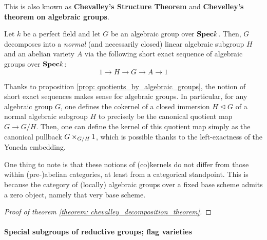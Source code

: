                     \begin{theorem} \label{theorem: chevalley_decomposition_theorem}
                        This is also known as \textbf{Chevalley's Structure Theorem} and \textbf{Chevelley's theorem on algebraic groups}.
                    
                        Let $k$ be a perfect field and let $G$ be an algebraic group over $\mathbf{Spec} k$. Then, $G$ decomposes into a \textit{normal} (and necessarily closed) linear algebraic subgroup $H$ and an abelian variety $A$ via the following short exact sequence of algebraic groups over $\mathbf{Spec} k$:
                            $$1 \to H \to G \to A \to 1$$
                    \end{theorem}
                    \begin{remark} \label{remark: short_exact_sequences_algebraic_groups}
                        Thanks to proposition \ref{prop: quotients_by_algebraic_groups}, the notion of short exact sequences makes sense for algebraic groups. In particular, for any algebraic group $G$, one defines the cokernel of a closed immersion $H \trianglelefteq G$ of a normal algebraic subgroup $H$ to precisely be the canonical quotient map $G \to G/H$. Then, one can define the kernel of this quotient map simply as the canonical pullback $G \x_{G/H} 1$, which is possible thanks to the left-exactness of the Yoneda embedding. 
                        
                        One thing to note is that these notions of (co)kernels do not differ from those within (pre-)abelian categories, at least from a categorical standpoint. This is because the category of (locally) algebraic groups over a fixed base scheme admits a zero object, namely that very base scheme. 
                    \end{remark}
                        \begin{proof}[Proof of theorem \ref{theorem: chevalley_decomposition_theorem}]
                            
                        \end{proof}
                    
                \paragraph{Special subgroups of reductive groups; flag varieties}
            
